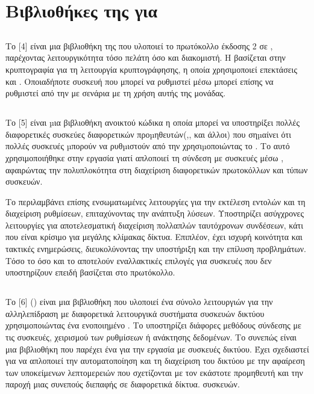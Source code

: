 \section{Βιβλιοθήκες της  για }

\subsection{}
Το [4] είναι μια βιβλιοθήκη της  που υλοποιεί το πρωτόκολλο  έκδοσης 2 σε , παρέχοντας λειτουργικότητα τόσο πελάτη όσο και διακομιστή.
Η  βασίζεται στην κρυπτογραφία για τη λειτουργία κρυπτογράφησης, η οποία χρησιμοποιεί επεκτάσεις  και .
Οποιαδήποτε συσκευή που μπορεί να ρυθμιστεί μέσω  μπορεί επίσης να ρυθμιστεί από την  με σενάρια με τη χρήση αυτής της μονάδας.

\subsection{}
Το [5] είναι µια βιβλιοθήκη  ανοικτού κώδικα η οποία μπορεί να υποστηρίξει πολλές 
διαφορετικές συσκεύες διαφορετικών προµηθευτών(,, και άλλοι) που σηµαίνει ότι πολλές συσκευές µπορούν 
να ρυθµιστούν από την  χρησιµοποιώντας το . 
Το  αυτό χρησιμοποιήθηκε στην εργασία γιατί απλοποιεί τη σύνδεση με συσκευές μέσω , αφαιρώντας την πολυπλοκότητα στη διαχείριση διαφορετικών πρωτοκόλλων και 
τύπων συσκευών.


Το  περιλαμβάνει επίσης ενσωματωμένες λειτουργίες για την εκτέλεση εντολών και τη διαχείριση ρυθμίσεων, επιταχύνοντας την ανάπτυξη λύσεων.
Υποστηρίζει ασύγχρονες λειτουργίες για αποτελεσματική διαχείριση πολλαπλών ταυτόχρονων συνδέσεων, κάτι που είναι κρίσιμο για μεγάλης κλίμακας δίκτυα. Επιπλέον, έχει ισχυρή 
κοινότητα και τακτικές ενημερώσεις, διευκολύνοντας την υποστήριξη και την επίλυση προβλημάτων.
Τόσο το  όσο και το  αποτελούν εναλλακτικές επιλογές για συσκευές που δεν υποστηρίζουν  επειδή βασίζεται στο  πρωτόκολλο.


\subsection{}
Το [6] () είναι μια βιβλιοθήκη  που υλοποιεί ένα σύνολο λειτουργιών για την αλληλεπίδραση με διαφορετικά λειτουργικά συστήματα συσκευών δικτύου χρησιμοποιώντας ένα ενοποιημένο .
Το  υποστηρίζει διάφορες μεθόδους σύνδεσης με τις συσκευές, χειρισμού των ρυθμίσεων ή ανάκτησης δεδομένων. Το  συνεπώς είναι μια βιβλιοθήκη  που παρέχει ένα 
 για την εργασία με συσκευές δικτύου. Έχει σχεδιαστεί για να απλοποιεί την
αυτοματοποίηση και τη διαχείριση του δικτύου με την αφαίρεση των υποκείμενων λεπτομερειών που σχετίζονται με τον εκάστοτε προμηθευτή και την παροχή μιας συνεπούς διεπαφής σε διαφορετικά δίκτυα. 
συσκευών.



